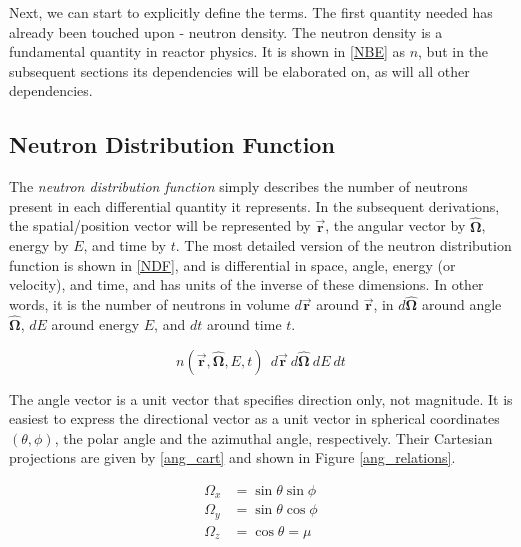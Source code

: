 Next, we can start to explicitly define the terms.  The first quantity needed has already been touched upon - neutron density.  The neutron density is a fundamental quantity in reactor physics.  It is shown in \eqref{NBE} as $n$, but in the subsequent sections its dependencies will be elaborated on, as will all other dependencies.


\subsection{Neutron Distribution Function}

The \emph{neutron distribution function} simply describes the number of neutrons present in each differential quantity it represents.  In the subsequent derivations, the spatial/position vector will be represented by $\boldsymbol{\vec{r}}$, the angular vector by $\boldsymbol{\hat{\Omega}}$, energy by $E$, and time by $t$.   The most detailed version of the neutron distribution function is shown in \eqref{NDF}, and is differential in space, angle, energy (or velocity), and time, and has units of the inverse of these dimensions.  In other words, it is the number of neutrons in volume $d\boldsymbol{\vec{r}}$ around $\boldsymbol{\vec{r}}$, in $d \boldsymbol{\hat{\Omega}}$ around angle $\boldsymbol{\hat{\Omega}}$, $dE$ around energy $E$, and $dt$ around time $t$. 

\begin{equation}
\label{NDF}
n(\boldsymbol{\vec{r}},\boldsymbol{\hat{\Omega}},E,t) \:\: d\boldsymbol{\vec{r}} \: d \boldsymbol{\hat{\Omega}} \: dE \: dt
\end{equation}


The angle vector is a unit vector that specifies direction only, not magnitude.  It is easiest to express the directional vector as a unit vector in spherical coordinates $(\theta, \phi)$, the polar angle and the azimuthal angle, respectively.  Their Cartesian projections are given by \eqref{ang_cart} and shown in Figure \ref{ang_relations}.

\begin{equation}
\label{ang_cart}
\begin{split}
\Omega_x &= \sin \theta \sin \phi  \\
\Omega_y &= \sin \theta \cos \phi \\
\Omega_z &= \cos \theta = \mu
\end{split}
\end{equation}

